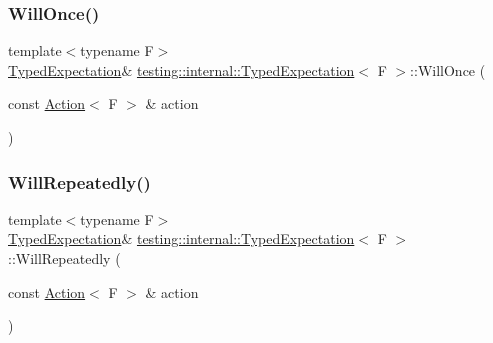 \mbox{\label{classtesting_1_1internal_1_1_typed_expectation_a41b0d15e44e95d52f4d5c310fb9e9683}} 
\subsubsection{\texorpdfstring{Will\+Once()}{WillOnce()}}
{\footnotesize\ttfamily template$<$typename F$>$ \\
\hyperlink{classtesting_1_1internal_1_1_typed_expectation}{Typed\+Expectation}\& \hyperlink{classtesting_1_1internal_1_1_typed_expectation}{testing\+::internal\+::\+Typed\+Expectation}$<$ F $>$\+::Will\+Once (\begin{DoxyParamCaption}\item[{const \hyperlink{classtesting_1_1_action}{Action}$<$ F $>$ \&}]{action }\end{DoxyParamCaption})\hspace{0.3cm}{\ttfamily [inline]}}

\mbox{\label{classtesting_1_1internal_1_1_typed_expectation_a73586c1adb458c5c431df9679e46f5f1}} 
\subsubsection{\texorpdfstring{Will\+Repeatedly()}{WillRepeatedly()}}
{\footnotesize\ttfamily template$<$typename F$>$ \\
\hyperlink{classtesting_1_1internal_1_1_typed_expectation}{Typed\+Expectation}\& \hyperlink{classtesting_1_1internal_1_1_typed_expectation}{testing\+::internal\+::\+Typed\+Expectation}$<$ F $>$\+::Will\+Repeatedly (\begin{DoxyParamCaption}\item[{const \hyperlink{classtesting_1_1_action}{Action}$<$ F $>$ \&}]{action }\end{DoxyParamCaption})\hspace{0.3cm}{\ttfamily [inline]}}

